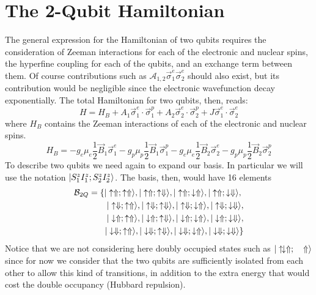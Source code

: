 \FloatBarrier
%
%


\section{The 2-Qubit Hamiltonian}
The general expression for the Hamiltonian of two qubits requires the consideration of Zeeman interactions for each of the electronic and nuclear spins, the hyperfine coupling for each of the qubits, and an exchange term between them. Of course contributions such as  $\mathcal{A}_{1,2}\vec{\sigma}^e_1\vec{\sigma}^e_2$ should also exist, but its contribution would be negligible since the electronic wavefunction decay exponentially. The total Hamiltonian for two qubits, then, reads:
\begin{equation}
  H = H_B +A_1\vec{\sigma}^e_1\cdot\vec{\sigma}^p_1
      +A_2\vec{\sigma}^e_2\cdot\vec{\sigma}^p_2
      +J\vec{\sigma}^e_1\cdot\vec{\sigma}^e_2
\label{ham2Q}
\end{equation}
where $H_B$ contains the Zeeman interactions of each of the electronic and nuclear spins.
\begin{equation}
  H_B = -g_e\mu_e\frac{1}{2}\vec{B}_1\vec{\sigma}^e_1
      -g_p\mu_p\frac{1}{2}\vec{B}_1\vec{\sigma}^p_1
      -g_e\mu_e\frac{1}{2}\vec{B}_2\vec{\sigma}^e_2
      -g_p\mu_p\frac{1}{2}\vec{B}_2\vec{\sigma}^p_2
\label{ham2Q_zeeman}
\end{equation}
To describe two qubits we need again to expand our basis. In particular we will use the notation $|S^z_1I^z_1;S^z_2I^z_2\rangle$. The basis, then, would have 16 elements
\begin{equation}
\begin{split}
 \mathcal{B}_{2Q} =  \left\{|\uparrow\Uparrow;\uparrow\Uparrow\rangle,|\uparrow\Uparrow;\uparrow\Downarrow\rangle,|\uparrow\Uparrow;\downarrow\Uparrow\rangle,|\uparrow\Uparrow;\downarrow\Downarrow\rangle,\right.\\
        |\uparrow\Downarrow;\uparrow\Uparrow\rangle,|\uparrow\Downarrow;\uparrow\Downarrow\rangle,|\uparrow\Downarrow;\downarrow\Uparrow\rangle,|\uparrow\Downarrow;\downarrow\Downarrow\rangle,\\
        |\downarrow\Uparrow;\uparrow\Uparrow\rangle,|\downarrow\Uparrow;\uparrow\Downarrow\rangle,|\downarrow\Uparrow;\downarrow\Uparrow\rangle,|\downarrow\Uparrow;\downarrow\Downarrow\rangle,\\
 \left.|\downarrow\Downarrow;\uparrow\Uparrow\rangle,|\downarrow\Downarrow;\uparrow\Downarrow\rangle,|\downarrow\Downarrow;\downarrow\Uparrow\rangle,|\downarrow\Downarrow;\downarrow\Downarrow\rangle \right\}
\end{split}
\end{equation}
Notice that we are not considering here doubly occupied states such as $|\uparrow\mathrel{\mspace{-3mu}}\downarrow\Uparrow;\quad\Uparrow\rangle$ since for now we consider that the two qubits are sufficiently isolated from each other to allow this kind of transitions, in addition to the extra energy that would cost the double occupancy (Hubbard repulsion).

